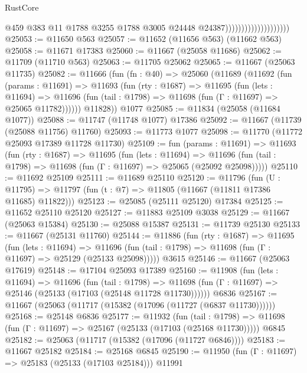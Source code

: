 \begin{lexlean}{RustCore}
\begin{coremodule}
                                            @459
                                            @383
                                            @11
                                            @1788
                                            @3255
                                            @1788
                                            @3005
                                            @24448
                                            @24387))))))))))))))))))))
@25053 := @11650 @563
@25057 := @11652 (@11656 @563) (@11662 @563)
@25058 := @11671 @17383
@25060 := @11667 (@25058 @11686)
@25062 := @11709 (@11710 @563)
@25063 := @11705 @25062
@25065 := @11667 (@25063 @11735)
@25082 := @11666
    (fun (fn : @40) =>
    @25060
      (@11689
        (@11692
          (fun (params : @11691) =>
          @11693
            (fun (rty : @1687) =>
            @11695
              (fun (lets : @11694) =>
              @11696 (fun (tail : @1798) => @11698 (fun (Γ : @11697) => @25065 @11782))))))
        @11828))
    @1077
@25085 := @11834 (@25058 (@11684 @1077))
@25088 := @11747 (@11748 @1077) @17386
@25092 := @11667 (@11739 (@25088 @11756) @11760)
@25093 := @11773 @1077
@25098 := @11770 (@11772 @25093 @17389 @11728 @11730)
@25109 := fun (params : @11691) =>
  @11693
    (fun (rty : @1687) =>
    @11695
      (fun (lets : @11694) =>
      @11696 (fun (tail : @1798) => @11698 (fun (Γ : @11697) => @25065 (@25092 @25098)))))
@25110 := @11692 @25109
@25111 := @11689 @25110
@25120 := @11796
    (fun (U : @11795) => @11797 (fun (t : @7) => @11805 (@11667 (@11811 @17386 @11685) @11822)))
@25123 := @25085 (@25111 @25120) @17384
@25125 := @11652 @25110 @25120
@25127 := @11883 @25109 @3038
@25129 := @11667 (@25063 @15384)
@25130 := @25088 @15387
@25131 := @11739 @25130
@25133 := @11667 (@25131 @11760)
@25144 := @11886
    (fun (rty : @1687) =>
    @11695
      (fun (lets : @11694) =>
      @11696 (fun (tail : @1798) => @11698 (fun (Γ : @11697) => @25129 (@25133 @25098)))))
    @3615
@25146 := @11667 (@25063 @17619)
@25148 := @17104 @25093 @17389
@25160 := @11908
    (fun (lets : @11694) =>
    @11696
      (fun (tail : @1798) =>
      @11698 (fun (Γ : @11697) => @25146 (@25133 (@17103 (@25148 @11728 @11730))))))
    @6836
@25167 := @11667 (@25063 (@11717 (@15382 (@17096 (@11727 (@6837 @11730))))))
@25168 := @25148 @6836
@25177 := @11932
    (fun (tail : @1798) => @11698 (fun (Γ : @11697) => @25167 (@25133 (@17103 (@25168 @11730)))))
    @6845
@25182 := @25063 (@11717 (@15382 (@17096 (@11727 @6846))))
@25183 := @11667 @25182
@25184 := @25168 @6845
@25190 := @11950 (fun (Γ : @11697) => @25183 (@25133 (@17103 @25184))) @11991

\end{coremodule}
\end{lexlean}
